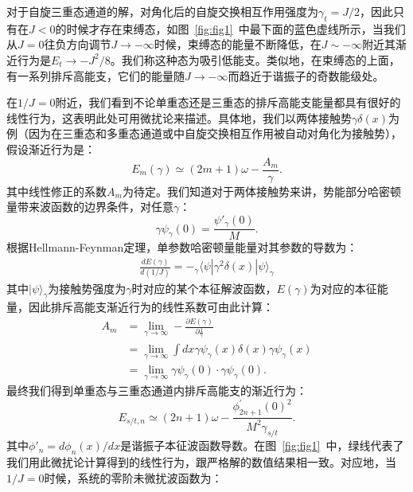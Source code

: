 对于自旋三重态通道的解，对角化后的自旋交换相互作用强度为$\gamma_t=J/2$，因此只有在$J<0$的时候才存在束缚态，如图~\ref{fig:fig1}~中最下面的蓝色虚线所示，当我们从$J=0$往负方向调节$J\to-\infty$时候，束缚态的能量不断降低，在$J\sim -\infty$附近其渐近行为是$E_t\rightarrow -J^2/8$。我们称这种态为吸引低能支。类似地，在束缚态的上面，有一系列排斥高能支，它们的能量随$J\to-\infty$而趋近于谐振子的奇数能级处。

在$1/J=0$附近，我们看到不论单重态还是三重态的排斥高能支能量都具有很好的线性行为，这表明此处可用微扰论来描述。具体地，我们以两体接触势$\gamma\delta(x)$为例（因为在三重态和多重态通道或中自旋交换相互作用被自动对角化为接触势），假设渐近行为是：
\begin{equation}
    E_m(\gamma) \simeq  (2m+1)\omega - \frac{A_m}{\gamma}.
\end{equation}
其中线性修正的系数$A_m$为待定。我们知道对于两体接触势来讲，势能部分哈密顿量带来波函数的边界条件，对任意$\gamma$：
\begin{equation}
    \gamma\psi_\gamma(0) = \frac{\psi'_\gamma(0)}{M}.
\end{equation}
根据Hellmann-Feynman定理，单参数哈密顿量能量对其参数的导数为：
\begin{equation}
\begin{split}
    \frac{dE(\gamma)}{d(1/J)} = -{}_\gamma\langle\psi| \gamma^2\delta(x) |\psi\rangle_\gamma
\end{split}
\end{equation}
其中$|\psi\rangle_\gamma$为接触势强度为$\gamma$时对应的某个本征解波函数，$E(\gamma)$为对应的本征能量，因此排斥高能支渐近行为的线性系数可由此计算：
\begin{equation}
\begin{split}
    A_m &= \lim_{\gamma\to \infty} -\frac{\partial E(\gamma)}{\partial \frac{1}{\gamma} }\\
    \quad &= \lim_{\gamma\to \infty} \int dx \gamma\psi_\gamma(x)\delta(x)\gamma\psi_\gamma(x) \\
    \quad &= \lim_{\gamma\to \infty} \gamma\psi_\gamma(0)\cdot \gamma\psi_\gamma(0). 
\end{split}
\end{equation}
最终我们得到单重态与三重态通道内排斥高能支的渐近行为：
\begin{equation}
E_{s/t,n} \simeq (2n+1)\omega -\frac{\phi^{'}_{2n+1}(0)^2}{M^2\gamma_{s/t}}. \label{asymptotic}
\end{equation}
其中$\phi'_n=d\phi_n(x)/dx$是谐振子本征波函数导数。在图~\ref{fig:fig1}~中，绿线代表了我们用此微扰论计算得到的线性行为，跟严格解的数值结果相一致。对应地，当$1/J=0$时候，系统的零阶未微扰波函数为\cite{zurn2012fermionization}：
